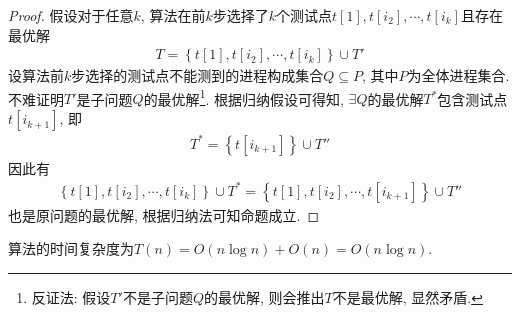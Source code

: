 \documentclass{article}
\begin{document}
\begin{homeworkProblem}
\begin{proof}
		假设对于任意$k$, 算法在前$k$步选择了$k$个测试点$t[1],t[i_2],\cdots,t[i_k]$且存在最优解
		\begin{align}
			T=\left\{ t\left[ 1 \right] ,t\left[ i_2 \right] ,\cdots ,t\left[ i_k \right] \right\} \cup T'
		\end{align}
		设算法前$k$步选择的测试点不能测到的进程构成集合$Q\subseteq P$, 其中$P$为全体进程集合. 不难证明$T'$是子问题$Q$的最优解\footnote{反证法: 假设$T'$不是子问题$Q$的最优解, 则会推出$T$不是最优解, 显然矛盾.}. 根据归纳假设可得知, $\exists Q$的最优解$T^{\ast}$包含测试点$t[i_{k+1}]$, 即
		\begin{align}
			T^{\ast}=\left\{ t\left[ i_{k+1} \right] \right\} \cup T''
		\end{align}
		因此有
		\begin{align}
			\left\{ t\left[ 1 \right] ,t\left[ i_2 \right] ,\cdots ,t\left[ i_k \right] \right\} \cup T^{\ast}=\left\{ t\left[ 1 \right] ,t\left[ i_2 \right] ,\cdots ,t\left[ i_{k+1} \right] \right\} \cup T''
		\end{align}
		也是原问题的最优解, 根据归纳法可知命题成立.
	\end{proof}
	算法的时间复杂度为$T\left( n \right) =O\left( n\log n \right) +O\left( n \right) =O\left( n\log n \right)$.
	\newpage
\end{homeworkProblem}

\pagebreak
\end{document}
